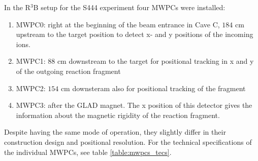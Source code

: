 In the R$^3$B setup for the S444 experiment four MWPCs were installed:\newline
\begin{enumerate}
\item MWPC0: right at the beginning of the beam entrance in Cave C, $184$ cm upstream to the target position to detect x- and y positions of the incoming ions.
\item MWPC1: $88$ cm downstream to the target for positional tracking in x and y of the outgoing reaction fragment
\item MWPC2: $154$ cm downsteram also for positional tracking of the fragment
\item MWPC3: after the GLAD magnet. The x position of this detector gives the information about the magnetic rigidity of the reaction fragment.  %
\end{enumerate}
Despite having the same mode of operation, they slightly differ in their construction design and positional resolution. For the technical specifications of the individual MWPCs, see table \ref{table:mwpcs_tecs}.
